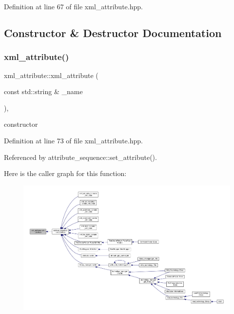 Definition at line 67 of file xml\+\_\+attribute.\+hpp.



\subsection{Constructor \& Destructor Documentation}
\mbox{\label{classxml__attribute_acd1416f7f3d7a255cd2a5ef5636fb820}} 
\subsubsection{\texorpdfstring{xml\+\_\+attribute()}{xml\_attribute()}}
{\footnotesize\ttfamily xml\+\_\+attribute\+::xml\+\_\+attribute (\begin{DoxyParamCaption}\item[{const std\+::string \&}]{\+\_\+name }\end{DoxyParamCaption})\hspace{0.3cm}{\ttfamily [inline]}, {\ttfamily [explicit]}}



constructor 



Definition at line 73 of file xml\+\_\+attribute.\+hpp.



Referenced by attribute\+\_\+sequence\+::set\+\_\+attribute().

Here is the caller graph for this function\+:
\nopagebreak
\begin{figure}[H]
\begin{center}
\leavevmode
\includegraphics[width=350pt]{d8/dd2/classxml__attribute_acd1416f7f3d7a255cd2a5ef5636fb820_icgraph}
\end{center}
\end{figure}


